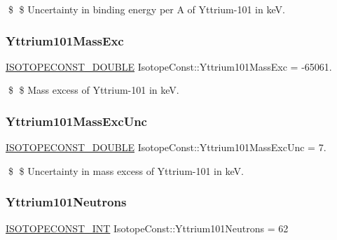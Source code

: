 \$ \$ Uncertainty in binding energy per A of Yttrium-\/101 in keV. \mbox{\label{group___isotope_const-_yttrium-_y101_gaf4cc19173591bb5c6e0fbbc4fd8f763e}} 
\subsubsection{\texorpdfstring{Yttrium101\+Mass\+Exc}{Yttrium101MassExc}}
{\footnotesize\ttfamily \mbox{\hyperlink{group___isotope_const-_macros_ga8f45a7272ce02c0b4c65c44636ed719a}{I\+S\+O\+T\+O\+P\+E\+C\+O\+N\+S\+T\+\_\+\+D\+O\+U\+B\+LE}} Isotope\+Const\+::\+Yttrium101\+Mass\+Exc = -\/65061.}

\$ \$ Mass excess of Yttrium-\/101 in keV. \mbox{\label{group___isotope_const-_yttrium-_y101_ga009d792dcdb97350cedffdf334b91db4}} 
\subsubsection{\texorpdfstring{Yttrium101\+Mass\+Exc\+Unc}{Yttrium101MassExcUnc}}
{\footnotesize\ttfamily \mbox{\hyperlink{group___isotope_const-_macros_ga8f45a7272ce02c0b4c65c44636ed719a}{I\+S\+O\+T\+O\+P\+E\+C\+O\+N\+S\+T\+\_\+\+D\+O\+U\+B\+LE}} Isotope\+Const\+::\+Yttrium101\+Mass\+Exc\+Unc = 7.}

\$ \$ Uncertainty in mass excess of Yttrium-\/101 in keV. \mbox{\label{group___isotope_const-_yttrium-_y101_gaec4c64c11eaa2bd8d414729cb1361368}} 
\subsubsection{\texorpdfstring{Yttrium101\+Neutrons}{Yttrium101Neutrons}}
{\footnotesize\ttfamily \mbox{\hyperlink{group___isotope_const-_macros_ga5f18360b3e99483a35c32d789e62621c}{I\+S\+O\+T\+O\+P\+E\+C\+O\+N\+S\+T\+\_\+\+I\+NT}} Isotope\+Const\+::\+Yttrium101\+Neutrons = 62}

